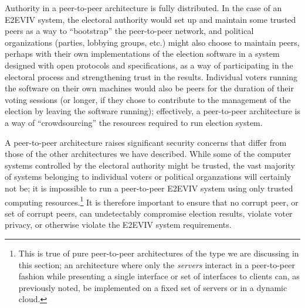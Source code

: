 Authority in a peer-to-peer architecture is fully distributed. In the
case of an E2EVIV system, the electoral authority would set up and
maintain some trusted peers as a way to ``bootstrap'' the peer-to-peer
network, and political organizations (parties, lobbying groups, etc.)
might also choose to maintain peers, perhaps with their own
implementations of the election software in a system designed with
open protocols and specifications, as a way of participating in the
electoral process and strengthening trust in the results. Individual
voters running the software on their own machines would also be peers
for the duration of their voting sessions (or longer, if they chose to
contribute to the management of the election by leaving the software
running); effectively, a peer-to-peer architecture is a way of
``crowdsourcing'' the resources required to run election system. 

A peer-to-peer architecture raises significant security concerns
that differ from those of the other architectures we have
described. While some of the computer systems controlled by the
electoral authority might be trusted, the vast majority of systems
belonging to individual voters or political organzations will
certainly not be; it is impossible to run a peer-to-peer E2EVIV system
using only trusted computing resources.\footnote{This is true of pure
  peer-to-peer architectures of the type we are discussing in this
  section; an architecture where only the \emph{servers} interact in a
  peer-to-peer fashion while presenting a single interface or set of
  interfaces to clients can, as previously noted, be implemented on a
  fixed set of servers or in a dynamic cloud.} It is therefore
important to ensure that no corrupt peer, or set of corrupt peers, can
undetectably compromise election results, violate voter privacy, or
otherwise violate the E2EVIV system requirements.

